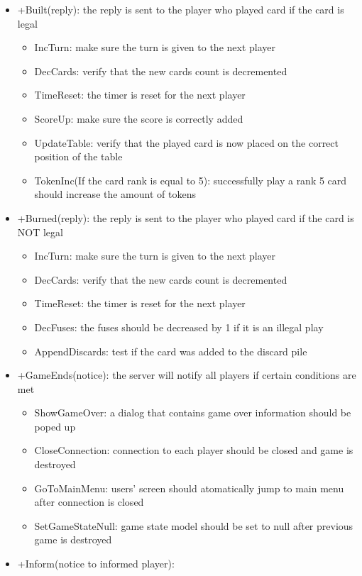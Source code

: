 \documentclass[12pt]{article}
\begin{document}
\begin{description}
\begin{itemize}
        \item +Built(reply): the reply is sent to the player who played card if the card is legal
			\begin{itemize}
		    	\item IncTurn: make sure the turn is given to the next player
		    	\item DecCards: verify that the new cards count is decremented
		    	\item TimeReset: the timer is reset for the next player
			\item ScoreUp: make sure the score is correctly added
			\item UpdateTable: verify that the played card is now placed on the correct position of the table
			\item TokenInc(If the card rank is equal to 5): successfully play a rank 5 card should increase the amount of tokens
    			\end{itemize}
		\item +Burned(reply): the reply is sent to the player who played card if the card is NOT legal
			\begin{itemize}
		    	\item IncTurn: make sure the turn is given to the next player
		    	\item DecCards: verify that the new cards count is decremented
		    	\item TimeReset: the timer is reset for the next player
			\item DecFuses: the fuses should be decreased by 1 if it is an illegal play
			\item AppendDiscards: test if the card was added to the discard pile
    			\end{itemize}
		\item +GameEnds(notice): the server will notify all players if certain conditions are met
			\begin{itemize}
		    	\item ShowGameOver: a dialog that contains game over information should be poped up
		    	\item CloseConnection: connection to each player should be closed and game is destroyed
		    	\item GoToMainMenu: users' screen should atomatically jump to main menu after connection is closed
			\item SetGameStateNull: game state model should be set to null after previous game is destroyed
    			\end{itemize}
		\item +Inform(notice to informed player):

\end{itemize}
\end{description}
\end{document}
